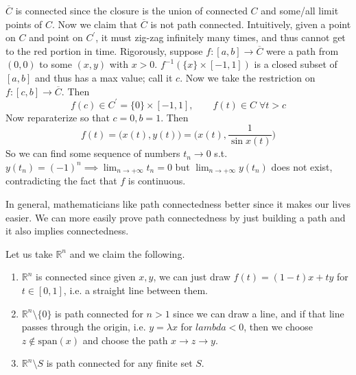 \begin{example}
    $\overline{C}$ is connected since the closure is the union of connected $C$ and some/all limit points of $C$. Now we claim that $\overline{C}$ is not path connected. Intuitively, given a point on $C$ and point on $C^\prime$, it must zig-zag infinitely many times, and thus cannot get to the red portion in time. Rigorously, suppose $f: [a, b] \rightarrow \overline{C}$ were a path from $(0, 0)$ to some $(x, y)$ with $x > 0$. $f^{-1} (\{x\} \times [-1, 1])$ is a closed subset of $[a, b]$ and thus has a max value; call it $c$. Now we take the restriction on $f: [c, b] \rightarrow \overline{C}$. Then 
    \begin{equation}
      f(c) \in C^\prime = \{0\} \times [-1, 1], \qquad f(t) \in C \; \forall t > c
    \end{equation} 
    Now reparaterize so that $c = 0, b = 1$. Then 
    \begin{equation}
      f(t) = \big( x(t), y(t) \big) = \big( x(t), \frac{1}{\sin{x(t)}} \big) 
    \end{equation}
    So we can find some sequence of numbers $t_n \rightarrow 0$ s.t. $y(t_n) = (-1)^n \implies \lim_{n \rightarrow +\infty} t_n = 0$ but $\lim_{n \rightarrow +\infty} y(t_n)$ does not exist, contradicting the fact that $f$ is continuous. 
  \end{example} 

  In general, mathematicians like path connectedness better since it makes our lives easier. We can more easily prove path connectedness by just building a path and it also implies connectedness.  

  \begin{example}
    Let us take $\mathbb{R}^n$ and we claim the following. 
    \begin{enumerate}
      \item $\mathbb{R}^n$ is connected since given $x, y$, we can just draw $f(t) = (1 - t) x + ty$ for $t \in [0, 1]$, i.e. a straight line between them. 
      \item $\mathbb{R}^n \setminus \{0\}$ is path connected for $n > 1$ since we can draw a line, and if that line passes through the origin, i.e. $y = \lambda x$ for $lambda < 0$, then we choose $z \not\in \mathrm{span}(x)$ and choose the path $x \rightarrow z \rightarrow y$. 
      \item $\mathbb{R}^n \setminus S$ is path connected for any finite set $S$. 
    \end{enumerate}
  \end{example} 

